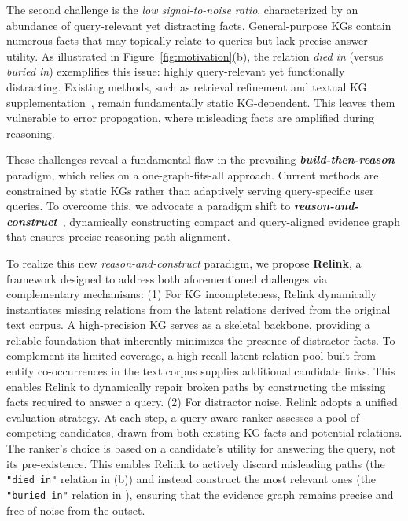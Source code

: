 \documentclass[letterpaper]{article} %
\begin{document}
The second challenge is the \textit{low signal-to-noise ratio}, characterized by an abundance of query-relevant yet distracting facts. 
General-purpose KGs contain numerous facts that may topically relate to queries but lack precise answer utility.
As illustrated in Figure~\ref{fig:motivation}(b), the relation \textit{died in} (versus \textit{buried in}) exemplifies this issue: highly query-relevant yet functionally distracting.
Existing methods, such as retrieval refinement and textual KG supplementation~\cite{ToG2,TCR-QF}, remain fundamentally static KG-dependent. This leaves them vulnerable to error propagation, where misleading facts are amplified during reasoning.


These challenges reveal a fundamental flaw in the prevailing \textbf{\textit{build-then-reason}} paradigm, which relies on a one-graph-fits-all approach. Current methods are constrained by static KGs rather than adaptively serving query-specific user queries. To overcome this, we advocate a paradigm shift to \textbf{\textit{reason-and-construct}}~\cite{Wu2025BEKO,Multimodal_GraphRAG}, dynamically constructing compact and query-aligned evidence graph that ensures precise reasoning path alignment.


To realize this new {\textit{reason-and-construct}} paradigm, we propose \textbf{Relink}, a framework designed to address both aforementioned challenges via complementary mechanisms: (1) For KG incompleteness, Relink dynamically instantiates missing relations from the latent relations derived from the original text corpus. A high-precision KG serves as a skeletal backbone, providing a reliable foundation that inherently minimizes the presence of distractor facts. To complement its limited coverage, a high-recall latent relation pool built from entity co-occurrences in the text corpus supplies additional candidate links. This enables Relink to dynamically repair broken paths by constructing the missing facts required to answer a query.
(2) For distractor noise, Relink adopts a unified evaluation strategy. At each step, a query-aware ranker assesses a pool of competing candidates, drawn from both existing KG facts and potential relations. The ranker's choice is based on a candidate's utility for answering the query, not its pre-existence. This enables Relink to actively discard misleading paths (the \texttt{"died in"} relation in (b)) and instead construct the most relevant ones (the \texttt{"buried in"} relation in ), ensuring that the evidence graph remains precise and free of noise from the outset.
\end{document}
